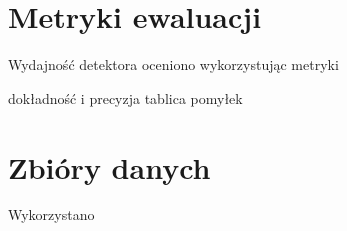 \section{Metryki ewaluacji}
Wydajność detektora oceniono wykorzystując metryki 

dokładność i precyzja tablica pomyłek 

\section{Zbióry danych }

Wykorzystano \cite{ODDS}